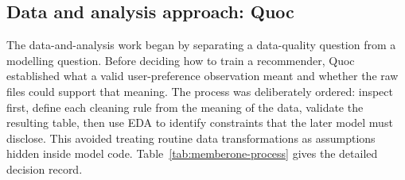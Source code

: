 \documentclass[12pt,a4paper]{article}
\newcommand{\memberone}{Mai Nam Quoc -- 29211145181}
\renewcommand{\memberone}{Quoc }
\begin{document}
\subsection{Data and analysis approach: \memberone}
The data-and-analysis work began by separating a data-quality question from a modelling question. Before deciding how to train a recommender, \memberone established what a valid user-preference observation meant and whether the raw files could support that meaning. The process was deliberately ordered: inspect first, define each cleaning rule from the meaning of the data, validate the resulting table, then use EDA to identify constraints that the later model must disclose. This avoided treating routine data transformations as assumptions hidden inside model code. Table~\ref{tab:memberone-process} gives the detailed decision record.
\end{document}
